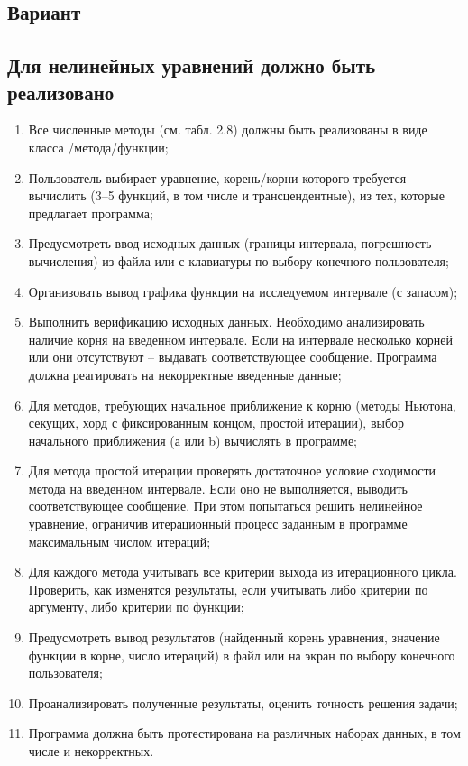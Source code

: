 \documentclass{article}
\begin{document}
\subsection{Вариант}

\subsection{Для нелинейных уравнений должно быть реализовано}

\begin{enumerate}
      \item Все численные методы (см. табл. 2.8) должны быть реализованы в виде класса /метода/функции;
      \item Пользователь выбирает уравнение, корень/корни которого требуется вычислить (3–5 функций, в том числе и трансцендентные), из тех, которые предлагает программа;
      \item Предусмотреть ввод исходных данных (границы интервала, погрешность вычисления) из файла или с клавиатуры по выбору конечного пользователя;
      \item Организовать вывод графика функции на исследуемом интервале (с запасом);
      \item Выполнить верификацию исходных данных. Необходимо анализировать наличие корня на введенном интервале. Если на интервале несколько корней или они отсутствуют – выдавать соответствующее сообщение. Программа должна реагировать на некорректные введенные данные;
      \item Для методов, требующих начальное приближение к корню (методы Ньютона, секущих, хорд с фиксированным концом, простой итерации), выбор начального приближения (а или b) вычислять в программе;
      \item Для метода простой итерации проверять достаточное условие сходимости метода на введенном интервале. Если оно не выполняется, выводить соответствующее сообщение. При этом попытаться решить нелинейное уравнение, ограничив итерационный процесс заданным в программе максимальным числом итераций;
      \item Для каждого метода учитывать все критерии выхода из итерационного цикла. Проверить, как изменятся результаты, если учитывать либо критерии по аргументу, либо критерии по функции;
      \item Предусмотреть вывод результатов (найденный корень уравнения, значение функции в корне, число итераций) в файл или на экран по выбору конечного пользователя;
      \item Проанализировать полученные результаты, оценить точность решения задачи;
      \item Программа должна быть протестирована на различных наборах данных, в том числе и некорректных.
\end{enumerate}
\end{document}
